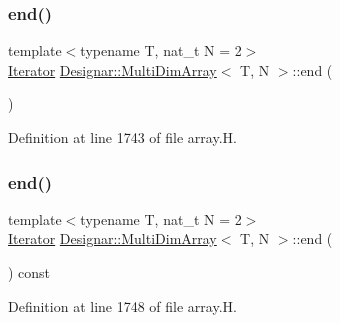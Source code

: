 \mbox{\label{class_designar_1_1_multi_dim_array_a6fc4ca23162a6b285f2a6fd698232459}} 
\subsubsection{\texorpdfstring{end()}{end()}\hspace{0.1cm}{\footnotesize\ttfamily [1/2]}}
{\footnotesize\ttfamily template$<$typename T, nat\+\_\+t N = 2$>$ \\
\hyperlink{class_designar_1_1_multi_dim_array_1_1_iterator}{Iterator} \hyperlink{class_designar_1_1_multi_dim_array}{Designar\+::\+Multi\+Dim\+Array}$<$ T, N $>$\+::end (\begin{DoxyParamCaption}{ }\end{DoxyParamCaption})\hspace{0.3cm}{\ttfamily [inline]}}



Definition at line 1743 of file array.\+H.

\mbox{\label{class_designar_1_1_multi_dim_array_a83200332e5914f2485d64cedb87b9470}} 
\subsubsection{\texorpdfstring{end()}{end()}\hspace{0.1cm}{\footnotesize\ttfamily [2/2]}}
{\footnotesize\ttfamily template$<$typename T, nat\+\_\+t N = 2$>$ \\
\hyperlink{class_designar_1_1_multi_dim_array_1_1_iterator}{Iterator} \hyperlink{class_designar_1_1_multi_dim_array}{Designar\+::\+Multi\+Dim\+Array}$<$ T, N $>$\+::end (\begin{DoxyParamCaption}{ }\end{DoxyParamCaption}) const\hspace{0.3cm}{\ttfamily [inline]}}



Definition at line 1748 of file array.\+H.

\mbox{\label{class_designar_1_1_multi_dim_array_a27a85daef556fb6cdb3f0c0b0d16e4d0}} 
